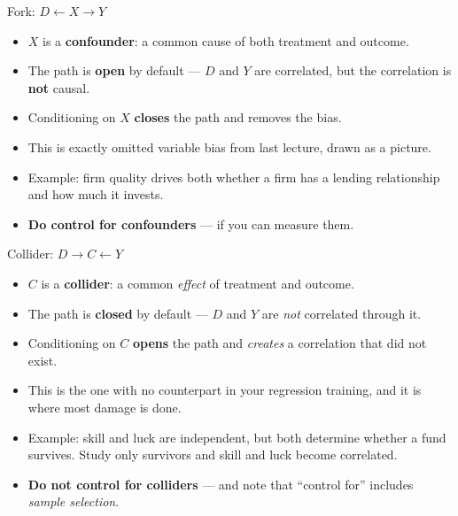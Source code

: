 \documentclass[
  11pt,
  ignorenonframetext,
  aspectratio=169,
]{beamer}
\providecommand{\tightlist}{%
  \setlength{\itemsep}{0pt}\setlength{\parskip}{0pt}}
\begin{document}
\begin{frame}{Fork: \(D \leftarrow X \to Y\)}
\protect{}\label{fork-d-leftarrow-x-to-y}
\begin{itemize}
\tightlist
\item
  \(X\) is a \textbf{confounder}: a common cause of both treatment and
  outcome.
\item
  The path is \textbf{open} by default --- \(D\) and \(Y\) are
  correlated, but the correlation is \textbf{not} causal.
\item
  Conditioning on \(X\) \textbf{closes} the path and removes the bias.
\item
  This is exactly omitted variable bias from last lecture, drawn as a
  picture.
\item
  Example: firm quality drives both whether a firm has a lending
  relationship and how much it invests.
\item
  \textbf{Do control for confounders} --- if you can measure them.
\end{itemize}
\end{frame}

\begin{frame}{Collider: \(D \to C \leftarrow Y\)}
\protect{}\label{collider-d-to-c-leftarrow-y}
\begin{itemize}
\tightlist
\item
  \(C\) is a \textbf{collider}: a common \emph{effect} of treatment and
  outcome.
\item
  The path is \textbf{closed} by default --- \(D\) and \(Y\) are
  \emph{not} correlated through it.
\item
  Conditioning on \(C\) \textbf{opens} the path and \emph{creates} a
  correlation that did not exist.
\item
  This is the one with no counterpart in your regression training, and
  it is where most damage is done.
\item
  Example: skill and luck are independent, but both determine whether a
  fund survives. Study only survivors and skill and luck become
  correlated.
\item
  \textbf{Do not control for colliders} --- and note that ``control
  for'' includes \emph{sample selection}.
\end{itemize}
\end{frame}
\end{document}
